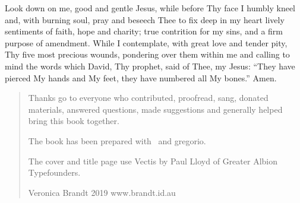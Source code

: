 \begin{center}
\begin{minipage}{5.8cm}

Look down on me, good and gentle Jesus,
while before Thy face I humbly kneel and,
with burning soul,
pray and beseech Thee
to fix deep in my heart lively sentiments
of faith, hope and charity;
true contrition for my sins,
and a firm purpose of amendment.
While I contemplate,
with great love and tender pity,
Thy five most precious wounds,
pondering over them within me
and calling to mind the words which David,
Thy prophet, said of Thee, my Jesus:
``They have pierced My hands and My feet,
they have numbered all My bones.''
Amen.
\end{minipage}
\end{center}

\vfill

\begin{quote}

Thanks go to everyone who contributed, proofread, sang, donated materials, answered questions, made suggestions and generally helped bring this book together.

The book has been prepared with \LuaLaTeX\ and gregorio. 


The cover and title page use Vectis by Paul Lloyd of Greater Albion Typefounders.

Veronica Brandt 2019 www.brandt.id.au

\end{quote}

